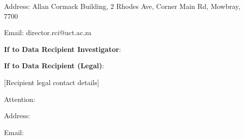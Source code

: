 \documentclass[12pt,letterpaper]{article}
\begin{document}
Address: Allan Cormack Building, 2 Rhodes Ave, Corner Main Rd, Mowbray, 7700

Email: director.rci@uct.ac.za

\textbf{If to Data Recipient Investigator}:

\textbf{If to Data Recipient (Legal)}:

[Recipient legal contact details]

Attention:

Address:

Email:


\end{document}
